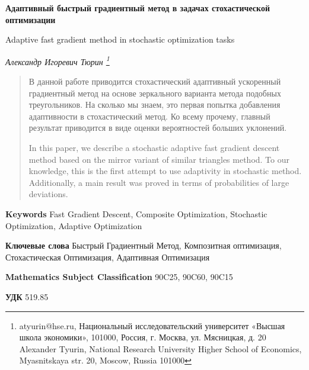\documentclass[11pt,a4]{article}
\begin{document}
\begin{center}
\bf
Адаптивный быстрый градиентный метод в задачах стохастической оптимизации

Adaptive fast gradient method in stochastic optimization tasks
\end{center}



\begin{center}
\textit{
Александр Игоревич Тюрин
\footnote{atyurin@hse.ru, Национальный исследовательский университет «Высшая школа экономики», 101000, Россия, г. Москва, ул. Мясницкая, д. 20 \\
Alexander Tyurin, National Research University Higher School of Economics, Myasnitskaya str. 20, Moscow, Russia 101000
}}
\end{center}


\begin{abstract}
В данной работе приводится стохастический адаптивный ускоренный градиентный метод на основе зеркального варианта метода подобных треугольников. На сколько мы знаем, это первая попытка добавления адаптивности в стохастический метод. Ко всему прочему, главный результат приводится в виде оценки вероятностей больших уклонений.

In this paper, we describe a stochastic adaptive fast gradient descent method based on the mirror variant of similar triangles method. To our knowledge, this is the first attempt to use adaptivity in stochastic method. Additionally, a main result was proved in terms of probabilities of large deviations.
\end{abstract}

\textbf{Keywords} Fast Gradient Descent, Composite Optimization, Stochastic Optimization, Adaptive Optimization

\textbf{Ключевые слова} Быстрый Градиентный Метод, Композитная оптимизация, Стохастическая Оптимизация, Адаптивная Оптимизация

\textbf{Mathematics Subject Classification} 90C25, 90C60, 90C15

\textbf{УДК} 519.85
\end{document}
